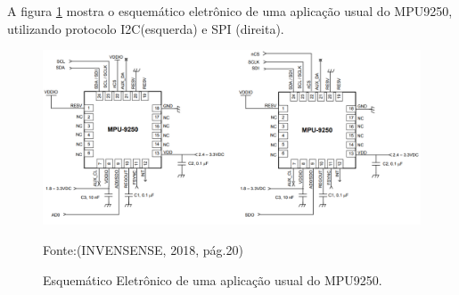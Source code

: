 \begin{table}[h]
\centering
\caption{Informações técnicas sobre sensor MPU9250.}
\label{tab_ive}
\end{table}

A figura \ref{mpu} mostra o esquemático eletrônico de uma aplicação usual do MPU9250, utilizando protocolo I2C(esquerda) e SPI (direita).

\begin{figure}[h]
	\centering
	\caption{Esquemático Eletrônico de uma aplicação usual do MPU9250.}
    
	\includegraphics[keepaspectratio=true,scale=0.4]{figuras/mpu9250.PNG}
	
	Fonte:(INVENSENSE, 2018, pág.20)\linebreak
	
	\label{mpu}
\end{figure}

